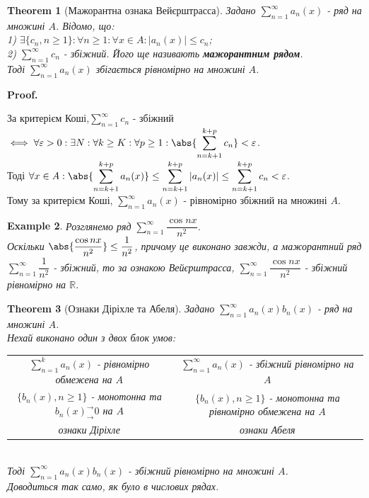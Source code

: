 \documentclass[a4paper, 10pt]{article}
\makeatletter
\def\huge{\displaystyle}
\def\qed{$\blacksquare$}
\theoremstyle{theoremdd}
\newtheorem{theorem}{Theorem}[subsection]
\theoremstyle{theoremdd}
\theoremstyle{theoremdd}
\theoremstyle{theoremdd}
\theoremstyle{theoremdd}
\newtheorem{example}[theorem]{Example}
\theoremstyle{theoremdd}
\theoremstyle{theoremdd}
\theoremstyle{theoremdd}
\theoremstyle{theoremdd}
\renewenvironment{proof}[1][Proof.\\]{\par
\pushQED{\hfill \qed}%
\normalfont \topsep6\p@\@plus6\p@\relax
\trivlist
\item\relax
{\bfseries
#1\@addpunct{.}}\hspace\labelsep\ignorespaces
}{%
\popQED\endtrivlist\@endpefalse
}
\makeatother
\begin{document}
\begin{theorem}[Мажорантна ознака Вейєрштрасса]
Задано $\huge \sum_{n=1}^\infty a_n(x)$ - ряд на множині $A$. Відомо, що:\\
1) $\exists \{c_n, n \geq 1\}: \forall n \geq 1: \forall x \in A: |a_n(x)| \leq c_n$;\\
2) $\huge \sum_{n=1}^\infty c_n$ - збіжний. Його ще називають \textbf{мажорантним рядом}.\\
Тоді $\huge \sum_{n=1}^\infty a_n(x)$ збігається рівномірно на множині $A$.
\end{theorem}

\begin{proof}
За критерієм Коші,$\huge \sum_{n=1}^\infty c_n$ - збіжний $\iff \forall \varepsilon > 0: \exists N: \forall k \geq K: \forall p \geq 1: \huge \abs{\sum_{n=k+1}^{k+p} c_n} < \varepsilon$. \\
Тоді $\forall x \in A: \huge\abs{\sum_{n=k+1}^{k+p} a_n(x)} \leq \sum_{n=k+1}^{k+p} |a_n(x)| \leq \sum_{n=k+1}^{k+p} c_n < \varepsilon$.\\
Тому за критерієм Коші, $\huge \sum_{n=1}^\infty a_n(x)$ - рівномірно збіжний на множині $A$.
\end{proof}

\begin{example}
Розглянемо ряд $\huge\sum_{n=1}^\infty \dfrac{\cos nx}{n^2}$.\\
Оскільки $\abs{\dfrac{\cos nx}{n^2}} \leq \dfrac{1}{n^2}$, причому це виконано завжди, а мажорантний ряд $\huge\sum_{n=1}^\infty \dfrac{1}{n^2}$ - збіжний, то за ознакою Вейєрштрасса, $\huge\sum_{n=1}^\infty \dfrac{\cos nx}{n^2}$ - збіжний рівномірно на $\mathbb{R}$.
\end{example}

\begin{theorem}[Ознаки Діріхле та Абеля]
Задано  $\huge \sum_{n=1}^\infty a_n(x) b_n(x)$ - ряд на множині $A$.\\
Нехай виконано один з двох блок умов:\\
\begin{tabular}{c | c}
$\huge\sum_{n=1}^k a_n(x)$ - рівномірно обмежена на $A$ & $\huge \sum_{n=1}^{\infty} a_n(x)$ - збіжний рівномірно на $A$ \\
$\{b_n(x), n \geq 1\}$ - монотонна та $b_n(x)^\rightarrow_\rightarrow 0$ на $A$ & $\{b_n(x), n \geq 1\}$ - монотонна та рівномірно обмежена на $A$\\
\textit{ознаки Діріхле} & \textit{ознаки Абеля}
\end{tabular}\\
Тоді $\huge \sum_{n=1}^{\infty} a_n(x) b_n(x)$ - збіжний рівномірно на множині $A$.\\
\textit{Доводиться так само, як було в числових рядах.}
\end{theorem}
\end{document}
